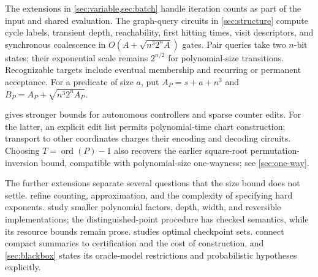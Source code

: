 \documentclass[11pt]{article}
\theoremstyle{definition}
\theoremstyle{remark}
\newcommand{\ord}{\operatorname{ord}}
\numberwithin{equation}{section}
\begin{document}
The extensions in \cref{sec:variable,sec:batch}
handle iteration counts as part of the input and shared evaluation.  The graph-query circuits
in \cref{sec:structure} compute cycle labels, transient depth, reachability,
first hitting times, visit descriptors, and synchronous coalescence in
$O(A+\sqrt{n^3 2^n A})$ gates.  Pair queries take two $n$-bit states; their exponential
scale remains $2^{n/2}$ for polynomial-size transitions.
Recognizable targets include eventual membership and recurring or permanent
acceptance.  For a predicate of size $a$, put $A_P=s+a+n^3$ and
$B_P=A_P+\sqrt{n^3 2^n A_P}$.

 gives stronger bounds for autonomous controllers and
sparse counter edits.  For the latter, an explicit edit list permits
polynomial-time chart construction; transport to other coordinates charges
their encoding and decoding circuits.  Choosing $T=\ord(P)-1$ also recovers
the earlier square-root permutation-inversion bound, compatible with
polynomial-size one-wayness; see \cref{sec:one-way}.

The further extensions separate several questions that the size bound
does not settle.  
refine counting, approximation, and the complexity of specifying hard
exponents.   study smaller
polynomial factors, depth, width, and reversible implementations;
the distinguished-point procedure has checked semantics, while its
resource bounds remain prose.   studies optimal
checkpoint sets.   connect
compact summaries to certification and the cost of construction, and
\cref{sec:blackbox} states its oracle-model restrictions and probabilistic
hypotheses explicitly.
\end{document}
